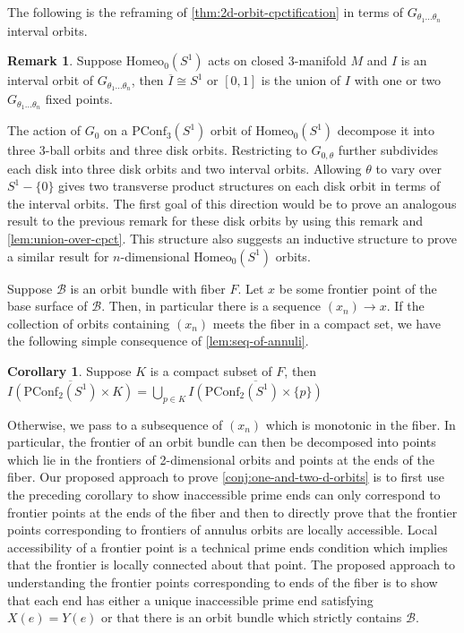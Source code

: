 \documentclass[10pt, oneside]{article}
\newcommand{\homeo}[1][S^1]{\text{Homeo}_0(#1)}
\newcommand{\cl}[1]{\overline{#1}}
\newcommand{\pconf}[2][S^1]{\text{PConf}_{#2}(#1)}
\theoremstyle{definition}
\newtheorem{rem}{Remark}[section]
\newtheorem{cor}{Corollary}[section]
\theoremstyle{definition}
\begin{document}
The following is the reframing of \cref{thm:2d-orbit-cpctification} in terms of $G_{\theta_1\dots\theta_n}$ interval orbits.

\begin{rem}
    Suppose $\homeo$ acts on closed 3-manifold $M$ and $I$ is an interval orbit of $G_{\theta_1\dots\theta_n}$, then $\cl{I}\cong S^1$ or $[0,1]$ is the union of $I$ with one or two $G_{\theta_1\dots\theta_n}$ fixed points.
\end{rem}

The action of $G_0$ on a $\pconf{3}$ orbit of $\homeo$ decompose it into three 3-ball orbits and three disk orbits. Restricting to $G_{0,\theta}$ further subdivides each disk into three disk orbits and two interval orbits. Allowing $\theta$ to vary over $S^1-\{0\}$ gives two transverse product structures on each disk orbit in terms of the interval orbits. 
The first goal of this direction would be to prove an analogous result to the previous remark for these disk orbits by using this remark and \cref{lem:union-over-cpct}. This structure also suggests an inductive structure to prove a similar result for $n$-dimensional $\homeo$ orbits.

Suppose $\mathcal{B}$ is an orbit bundle with fiber $F$. Let $x$ be some frontier point of the base surface of $\mathcal{B}$. Then, in particular there is a sequence $(x_n)\to x$. If the collection of orbits containing $(x_n)$ meets the fiber in a compact set, we have the following simple consequence of \cref{lem:seq-of-annuli}.
\begin{cor}
     Suppose $K$ is a compact subset of $F$, then $\cl{I(\pconf{2}\times K)} = \bigcup_{p\in K} \cl{I(\pconf{2}\times \{p\})}$
\end{cor}
Otherwise, we pass to a subsequence of $(x_n)$ which is monotonic in the fiber. In particular, the frontier of an orbit bundle can then be decomposed into points which lie in the frontiers of 2-dimensional orbits and points at the ends of the fiber. Our proposed approach to prove \cref{conj:one-and-two-d-orbits} is to first use the preceding corollary to show inaccessible prime ends can only correspond to frontier points at the ends of the fiber and then to directly prove that the frontier points corresponding to frontiers of annulus orbits are locally accessible. Local accessibility of a frontier point is a technical prime ends condition which implies that the frontier is locally connected about that point. The proposed approach to understanding the frontier points corresponding to ends of the fiber is to show that each end has either a unique inaccessible prime end satisfying $X(e)=Y(e)$ or that there is an orbit bundle which strictly contains $\mathcal{B}$.
\end{document}
